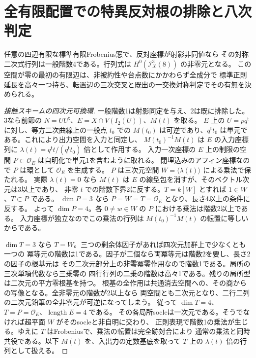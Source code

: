 \section{全有限配置での特異反対根の排除と八次判定}
\label{sec:all-finite-opposite-octics}
\begin{theorem}\label{thm:all-finite-opposite-octics}
任意の四辺有限な標準有限Frobenius窓で、反対座標が射影非同値なら
その対称二次式行列は一般階数4である。行列式は $H^0(\mathcal I_X^3(8))$ の非零元となる。
この空間が零の最初の有限辺は、非被約性や台点数にかかわらず全成分で
標準正則延長を高々一つ持ち、転置辺の三次交叉と既出の一交換対称判定でその有無を決められる。
\end{theorem}

\begin{proof}[接触スキームの四次元可換環]
一般階数1は射影同定を与え、2は既に排除した。3なら前節の
$N=UU^{\mathsf t}$、$E=X\cap V(I_2(U))$、$M(t)$ を取る。
$E$ 上の $U=pq^{\mathsf t}$ に対し、等方二次曲線上の一般点 $t_0$ での
$M(t_0)$ は可逆であり、$q^{\mathsf t}t_0$ は単元である。これにより出力空間を入力と同定し、
$M(t_0)^{-1}M(t)$ は $E$ の入力座標列に
$\lambda(t)=q^{\mathsf t}t/(q^{\mathsf t}t_0)$ 倍として作用する。
入力一次座標の $E$ 上の制限の空間 $P\subset\mathcal O_E$ は自明化で単元1を含むように取れる。
閉埋込みのアフィン座標なので $P$ は環として $\mathcal O_E$ を生成する。
$P$ は三次元空間 $W=\langle\lambda(t)\rangle$ による乗法で保たれる。
実際 $\lambda(t)=0$ なら $M(t)$ は $E$ の線型包を消すが、そのベクトル次元は3以上であり、
非零 $t$ での階数下界2に反する。$T=k[W]$ とすれば $1\in W$、$T\subset P$ である。
$\dim P=3$ なら $P=W=T=\mathcal O_E$ となり、長さ4以上の条件に反する。
よって $\dim P=4$。各 $0\ne w\in W$ の $P$ における乗法は階数2以上である。
入力座標が独立なのでこの乗法の行列は $M(t_0)^{-1}M(t)$ の転置に等しいからである。

$\dim T=3$ なら $T=W$。三つの剰余体因子があれば四次元加群上で少なくとも一つの
冪等元の階数は1である。因子が二個なら両冪等元は階数2を要し、長さ2の因子の根基元は
その二次元部分上の非零冪零作用なので階数1である。局所の三次単項代数なら三乗零の
四行行列の二乗の階数は高々1である。残りの局所型は二次元の平方零根基を持つ。
根基の全作用は共通消去空間への、その商からの写像となる。全非零元の階数が2以上なら
両空間とも二次元となり、二行二列の二次元鉛筆の全非零元が可逆になってしまう。
従って $\dim T=4$、$T=P=\mathcal O_E$、$\operatorname{length}E=4$ である。
その各局所socleは一次元である。そうでなければ超平面 $W$ がそのsocleと非自明に交わり、
正則表現で階数1の乗法が生じる。ゆえに $T$ はFrobeniusで、乗法の転置は完全跡対合により
通常の乗法と同時共役である。以下 $M(t)$ を、入出力の定数基底を取って
$T$ 上の $\lambda(t)$ 倍の行列として扱える。
\end{proof}

